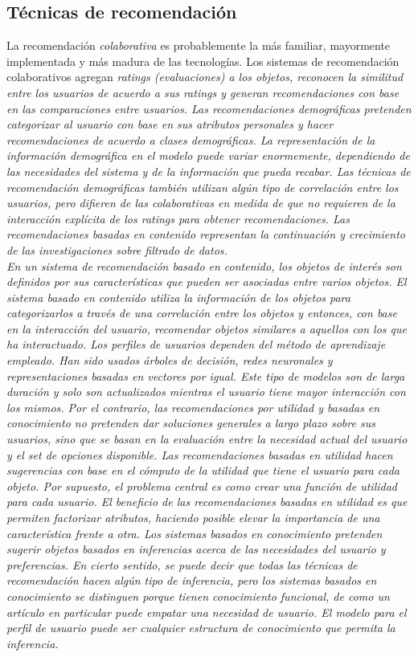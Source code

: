 \subsection{Técnicas de recomendación}
La recomendación \emph{colaborativa} es probablemente la más familiar, mayormente implementada y más madura de las tecnologías. Los sistemas de recomendación colaborativos agregan \it{ratings} (evaluaciones) a los objetos, reconocen la similitud entre los usuarios de acuerdo a sus \it{ratings} y generan recomendaciones con base en las comparaciones entre usuarios.
Las recomendaciones \emph{demográficas} pretenden categorizar al usuario con base en sus atributos personales y hacer recomendaciones de acuerdo a clases demográficas. La representación de la información demográfica en el modelo puede variar enormemente, dependiendo de las necesidades del sistema y de la información que pueda recabar. Las técnicas de recomendación demográficas también utilizan algún tipo de correlación entre los usuarios, pero difieren de las colaborativas en medida de que no requieren de la interacción explícita de los ratings para obtener recomendaciones. 
Las recomendaciones \emph{basadas en contenido} representan la continuación y crecimiento de las investigaciones sobre filtrado de datos.\\ En un sistema de recomendación basado en contenido, los objetos de interés son definidos por sus características que pueden ser asociadas entre varios objetos. El sistema basado en contenido utiliza la información de los objetos para categorizarlos a través de una correlación entre los objetos y entonces, con base en la interacción del usuario, recomendar objetos similares a aquellos con los que ha interactuado. Los perfiles de usuarios dependen del método de aprendizaje empleado. Han sido usados árboles de decisión, redes neuronales y representaciones basadas en vectores por igual. Este tipo de modelos son de larga duración y solo son actualizados mientras el usuario tiene mayor interacción con los mismos.
Por el contrario, las recomendaciones \emph{por utilidad} y \emph{basadas en conocimiento} no pretenden dar soluciones generales a largo plazo sobre sus usuarios, sino que se basan en la evaluación entre la necesidad actual del usuario y el set de opciones disponible. Las recomendaciones basadas en utilidad hacen sugerencias con base en el cómputo de la utilidad que tiene el usuario para cada objeto. Por supuesto, el problema central es como crear una función de utilidad para cada usuario. El beneficio de las recomendaciones basadas en utilidad es que permiten factorizar atributos, haciendo posible elevar la importancia de una característica frente a otra. 
Los sistemas \emph{basados en conocimiento} pretenden sugerir objetos basados en inferencias acerca de las necesidades del usuario y preferencias. En cierto sentido, se puede decir que todas las técnicas de recomendación hacen algún tipo de inferencia, pero los sistemas basados en conocimiento se distinguen porque tienen conocimiento funcional, de como un artículo en particular puede empatar una necesidad de usuario. El modelo para el perfil de usuario puede ser cualquier estructura de conocimiento que permita la inferencia. \cite{5}

